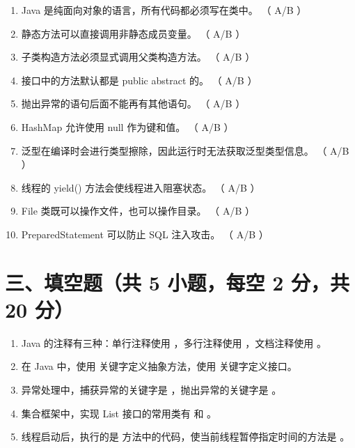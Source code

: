 \documentclass[a3paper, landscape, 11pt, twocolumn]{article}
\begin{document}
\begin{enumerate}[label=\arabic*., itemsep=0.8em]
	\item Java 是纯面向对象的语言，所有代码都必须写在类中。 （ \quad A/B \quad ）
	\item 静态方法可以直接调用非静态成员变量。 （ \quad A/B \quad ）
	\item 子类构造方法必须显式调用父类构造方法。 （ \quad A/B \quad ）
	\item 接口中的方法默认都是 public abstract 的。 （ \quad A/B \quad ）
	\item 抛出异常的语句后面不能再有其他语句。 （ \quad A/B \quad ）
	\item HashMap 允许使用 null 作为键和值。 （ \quad A/B \quad ）
	\item 泛型在编译时会进行类型擦除，因此运行时无法获取泛型类型信息。 （ \quad A/B \quad ）
	\item 线程的 yield() 方法会使线程进入阻塞状态。 （ \quad A/B \quad ）
	\item File 类既可以操作文件，也可以操作目录。 （ \quad A/B \quad ）
	\item PreparedStatement 可以防止 SQL 注入攻击。 （ \quad A/B \quad ）
\end{enumerate}

\section*{三、填空题（共 5 小题，每空 2 分，共 20 分）}

\begin{enumerate}[label=\arabic*., itemsep=1em]
	\item Java 的注释有三种：单行注释使用 \underline{\hspace{4cm}}，多行注释使用 \underline{\hspace{4cm}}，文档注释使用 \underline{\hspace{4cm}}。

	\item 在 Java 中，使用 \underline{\hspace{4cm}} 关键字定义抽象方法，使用 \underline{\hspace{4cm}} 关键字定义接口。

	\item 异常处理中，捕获异常的关键字是 \underline{\hspace{4cm}}，抛出异常的关键字是 \underline{\hspace{4cm}}。

	\item 集合框架中，实现 List 接口的常用类有 \underline{\hspace{4cm}} 和 \underline{\hspace{4cm}}。

	\item 线程启动后，执行的是 \underline{\hspace{4cm}} 方法中的代码，使当前线程暂停指定时间的方法是 \underline{\hspace{4cm}}。
\end{enumerate}
\end{document}
